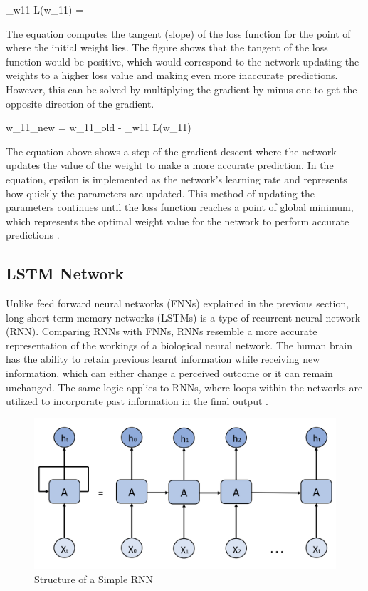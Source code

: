 \indent\newline
\nabla_{w11} L(w_{11}) = 

\indent\newline
The equation computes the tangent (slope) of the loss function for the point of where the initial weight lies. The figure shows that the tangent of the loss function would be positive, which would correspond to the network updating the weights to a higher loss value and making even more inaccurate predictions. However, this can be solved by multiplying the gradient by minus one to get the opposite direction of the gradient.  

\indent\newline
w_{11_{new}} = w_{11_{old}} - \epsilon \cdot \nabla_{w11} L(w_{11})

\indent\newline
The equation above shows a step of the gradient descent where the network updates the value of the weight to make a more accurate prediction. In the equation, epsilon is implemented as the network’s learning rate and represents how quickly the parameters are updated. This method of updating the parameters continues until the loss function reaches a point of global minimum, which represents the optimal weight value for the network to perform accurate predictions \cite{opper}.  

\subsection{LSTM Network}
Unlike feed forward neural networks (FNNs) explained in the previous section, long short-term memory networks (LSTMs) is a type of recurrent neural network (RNN). Comparing RNNs with FNNs, RNNs resemble a more accurate representation of the workings of a biological neural network. The human brain has the ability to retain previous learnt information while receiving new information, which can either change a perceived outcome or it can remain unchanged. The same logic applies to RNNs, where loops within the networks are utilized to incorporate past information in the final output \cite{adu}. 

\indent\newline 
\begin{figure}[H]
\centering
\includegraphics [scale=0.32,angle=360]{figures/rnn.png}
\caption{Structure of a Simple RNN}
\label{fig:rnn}
\end{figure}

